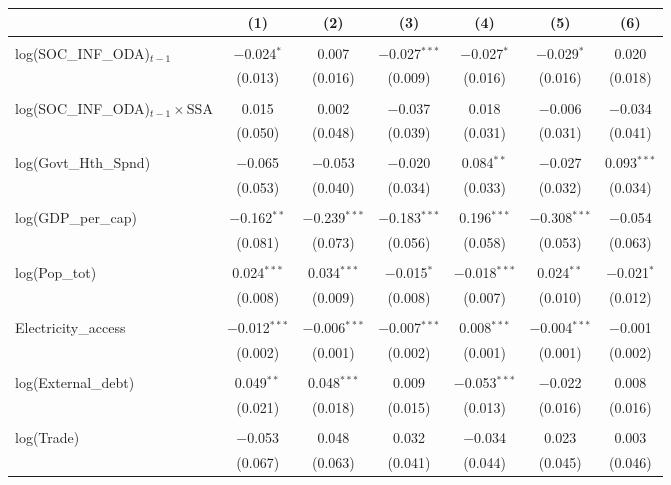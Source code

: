 \begin{table}[!htbp]
\begin{tabular}{@{\extracolsep{-2pt}}lcccccc}
\\[-1.8ex] & (1) & (2) & (3) & (4) & (5) & (6)\\ 
\hline \\[-1.8ex] 
  log(SOC\_INF\_ODA)$_{t-1}$ & $-$0.024$^{*}$ & 0.007 & $-$0.027$^{***}$ & $-$0.027$^{*}$ & $-$0.029$^{*}$ & 0.020 \\ 
  & (0.013) & (0.016) & (0.009) & (0.016) & (0.016) & (0.018) \\ 
  & & & & & & \\ 
 log(SOC\_INF\_ODA)$_{t-1}\times$SSA & 0.015 & 0.002 & $-$0.037 & 0.018 & $-$0.006 & $-$0.034 \\ 
  & (0.050) & (0.048) & (0.039) & (0.031) & (0.031) & (0.041) \\ 
  & & & & & & \\ 
log(Govt\_Hth\_Spnd) & $-$0.065 & $-$0.053 & $-$0.020 & 0.084$^{**}$ & $-$0.027 & 0.093$^{***}$ \\ 
  & (0.053) & (0.040) & (0.034) & (0.033) & (0.032) & (0.034) \\ 
  & & & & & & \\ 
 log(GDP\_per\_cap) & $-$0.162$^{**}$ & $-$0.239$^{***}$ & $-$0.183$^{***}$ & 0.196$^{***}$ & $-$0.308$^{***}$ & $-$0.054 \\ 
  & (0.081) & (0.073) & (0.056) & (0.058) & (0.053) & (0.063) \\ 
  & & & & & & \\ 
 log(Pop\_tot) & 0.024$^{***}$ & 0.034$^{***}$ & $-$0.015$^{*}$ & $-$0.018$^{***}$ & 0.024$^{**}$ & $-$0.021$^{*}$ \\ 
  & (0.008) & (0.009) & (0.008) & (0.007) & (0.010) & (0.012) \\ 
  & & & & & & \\ 
 Electricity\_access & $-$0.012$^{***}$ & $-$0.006$^{***}$ & $-$0.007$^{***}$ & 0.008$^{***}$ & $-$0.004$^{***}$ & $-$0.001 \\ 
  & (0.002) & (0.001) & (0.002) & (0.001) & (0.001) & (0.002) \\ 
  & & & & & & \\ 
 log(External\_debt) & 0.049$^{**}$ & 0.048$^{***}$ & 0.009 & $-$0.053$^{***}$ & $-$0.022 & 0.008 \\ 
  & (0.021) & (0.018) & (0.015) & (0.013) & (0.016) & (0.016) \\ 
  & & & & & & \\ 
 log(Trade) & $-$0.053 & 0.048 & 0.032 & $-$0.034 & 0.023 & 0.003 \\ 
  & (0.067) & (0.063) & (0.041) & (0.044) & (0.045) & (0.046) \\ 

\end{tabular}
\end{table}
